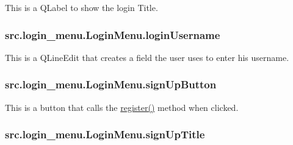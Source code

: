 This is a Q\+Label to show the login Title. 

\hypertarget{classsrc_1_1login__menu_1_1_login_menu_a762640516f0435f5764308fd0f00a6c9}{}
\subsubsection[{login\+Username}]{\setlength{\rightskip}{0pt plus 5cm}src.\+login\+\_\+menu.\+Login\+Menu.\+login\+Username}\label{classsrc_1_1login__menu_1_1_login_menu_a762640516f0435f5764308fd0f00a6c9}


This is a Q\+Line\+Edit that creates a field the user uses to enter his username. 

\hypertarget{classsrc_1_1login__menu_1_1_login_menu_a2d518012477c43a0d5b77385e2e4209f}{}
\subsubsection[{sign\+Up\+Button}]{\setlength{\rightskip}{0pt plus 5cm}src.\+login\+\_\+menu.\+Login\+Menu.\+sign\+Up\+Button}\label{classsrc_1_1login__menu_1_1_login_menu_a2d518012477c43a0d5b77385e2e4209f}


This is a button that calls the \hyperlink{classsrc_1_1login__menu_1_1_login_menu_af6ee6a8dee90f1a94a506400356707ad}{register()} method when clicked. 

\hypertarget{classsrc_1_1login__menu_1_1_login_menu_a07a65e6211f15b49d6e6abc0daac320b}{}
\subsubsection[{sign\+Up\+Title}]{\setlength{\rightskip}{0pt plus 5cm}src.\+login\+\_\+menu.\+Login\+Menu.\+sign\+Up\+Title}\label{classsrc_1_1login__menu_1_1_login_menu_a07a65e6211f15b49d6e6abc0daac320b}


